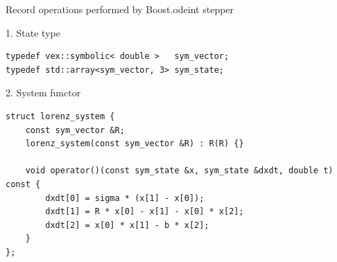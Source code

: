 \documentclass[@BEAMER_OPTIONS@]{beamer}
\begin{document}

\begin{frame}[fragile]{Record operations performed by Boost.odeint stepper}
    \begin{exampleblock}{1. State type}
        \begin{lstlisting}
typedef vex::symbolic< double >   sym_vector;
typedef std::array<sym_vector, 3> sym_state;
        \end{lstlisting}
    \end{exampleblock}

    \begin{exampleblock}{2. System functor}
        \begin{lstlisting}[firstnumber=last]
struct lorenz_system {
    const sym_vector &R;
    lorenz_system(const sym_vector &R) : R(R) {}

    void operator()(const sym_state &x, sym_state &dxdt, double t) const {
        dxdt[0] = sigma * (x[1] - x[0]);
        dxdt[1] = R * x[0] - x[1] - x[0] * x[2];
        dxdt[2] = x[0] * x[1] - b * x[2];
    }
};
        \end{lstlisting}
    \end{exampleblock}
\end{frame}

\end{document}

